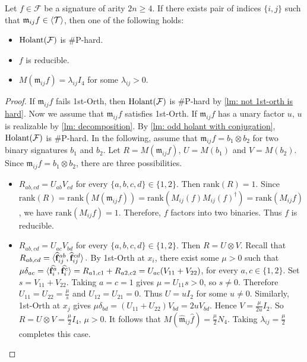 \begin{lemma}\label{lm: 2nd-orth mating reducible}
    Let $f\in \mathcal{F}$ be a signature of arity $2n\ge 4.$
    If there exists pair of indices $\{i,j\}$ such that $\mathfrak{m}_{ij}f\in \braket{\mathcal{T}}$, then one of the following holds:
    \begin{itemize}
        \item $\operatorname{Holant}(\mathcal{F})$ is \#P-hard.
        \item $f$ is reducible.
        \item $M(\mathfrak{m}_{ij}f)=\lambda_{ij}I_4$ for some $\lambda_{ij}>0.$
    \end{itemize}
\end{lemma}
\begin{proof}
    If $\mathfrak{m}_{ij}f$ fails {\sc 1st-Orth}, then $\operatorname{Holant}(\mathcal{F})$ is \#P-hard by \cref{lm: not 1st-orth is hard}.
    Now we assume that $\mathfrak{m}_{ij}f$ satisfies {\sc 1st-Orth}.
    If $\mathfrak{m}_{ij}f$ has a unary factor $u$, $u$ is realizable by \cref{lm: decomposition}.
    By \cref{lm: odd holant with conjugation}, $\operatorname{Holant}(\mathcal{F}
    )$ is \#P-hard.
    In the following, assume that $\mathfrak{m}_{ij}f=b_1\otimes b_2$ for two binary signatures $b_1$ and $b_2$.
    Let $R=M(\mathfrak{m}_{ij}f),\,U=M(b_1)$ and $V=M(b_2)$.
    Since $\mathfrak{m}_{ij}f=b_1\otimes b_2$, there are three possibilities.
    \begin{itemize}
        \item $R_{ab,cd}=U_{ab}V_{cd}$ for every $\{a,b,c,d\}\in\{1,2\}.$
        Then $\mathrm{rank}(R)=1.$
        Since $\mathrm{rank}(R)=\mathrm{rank}(M(\mathfrak{m}_{ij}f))=\mathrm{rank}(M_{ij}(f)M_{ij}(f)^\dagger)=\mathrm{rank}(M_{ij}f)$, we have $\mathrm{rank}(M_{ij}f)=1.$
        Therefore, $f$ factors into two binaries.
        Thus $f$ is reducible.
        
        \item $R_{ab,cd}=U_{ac}V_{bd}$ for every $\{a,b,c,d\}\in\{1,2\}.$
        Then $R=U\otimes V.$
        Recall that $R_{ab,cd}=\braket{\widehat{\mathbf{f}}_{ij}^{ab},\widehat{\mathbf{f}}_{ij}^{cd}}.$
        By {\sc 1st-Orth} at $x_i$, there exist some $\mu>0$ such that $\mu \delta_{ac}=\braket{\widehat{\mathbf{f}_i^a},\widehat{\mathbf{f}_i^c}}=R_{a1,c1}+R_{a2,c2}=U_{ac}(V_{11}+V_{22})$, for every $a,c\in\{1,2\}.$
        Set $s=V_{11}+V_{22}$.
        Taking $a=c=1$ gives $\mu=U_{11}s>0$, so $s\neq 0.$
        Therefore $U_{11}=U_{22}=\frac{\mu}{s}$ and $U_{12}=U_{21}=0$.
        Thus $U=uI_2$ for some $u\neq 0.$
        Similarly, {\sc 1st-Orth} at $x_j$ gives $\mu\delta_{bd}=(U_{11}+U_{22})V_{bd}=2uV_{bd}.$
        Hence $V=\frac{\mu}{2u}I_2.$
        So $R=U\otimes V=\frac{\mu}{2}I_4$, $\mu>0.$
        It follows that $M(\widehat{\mathfrak{m}}_{ij}\widehat{f})= \frac{\mu}{2} N_4$.
        Taking $\lambda_{ij}=\frac{\mu}{2}$ completes this case.
    

\end{itemize}
\end{proof}
